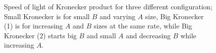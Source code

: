 \documentclass[12pt] {article}
\begin{document}
\begin{figure}[!tbh]
\centering        
   \caption{Speed of light of Kronecker product for three different configuration; Small Kronecker is for small $B$ and varying $A$ size, Big Kronecker (1) is for increasing $A$ and $B$ sizes at the same rate, while Big Kronecker (2) starts big $B$ and small $A$ and decreasing $B$ while increasing $A$.}   
   \label{fig:sol}
\end{figure}
\end{document}
